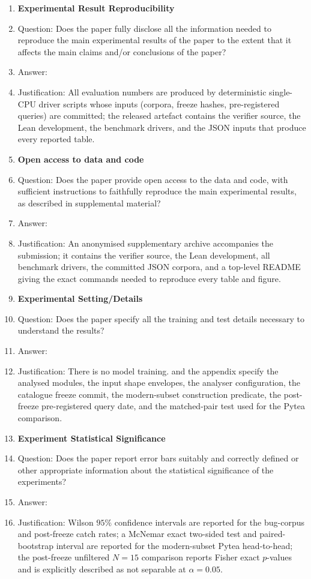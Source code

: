 \begin{enumerate}
\item {\bf Experimental Result Reproducibility}
    \item[] Question: Does the paper fully disclose all the information needed to reproduce the main experimental results of the paper to the extent that it affects the main claims and/or conclusions of the paper?
    \item[] Answer: \answerYes{}
    \item[] Justification: All evaluation numbers are produced by deterministic single-CPU driver scripts whose inputs (corpora, freeze hashes, pre-registered queries) are committed; the released artefact contains the verifier source, the Lean development, the benchmark drivers, and the JSON inputs that produce every reported table.

\item {\bf Open access to data and code}
    \item[] Question: Does the paper provide open access to the data and code, with sufficient instructions to faithfully reproduce the main experimental results, as described in supplemental material?
    \item[] Answer: \answerYes{}
    \item[] Justification: An anonymised supplementary archive accompanies the submission; it contains the verifier source, the Lean development, all benchmark drivers, the committed JSON corpora, and a top-level README giving the exact commands needed to reproduce every table and figure.

\item {\bf Experimental Setting/Details}
    \item[] Question: Does the paper specify all the training and test details necessary to understand the results?
    \item[] Answer: \answerYes{}
    \item[] Justification: There is no model training.  and the appendix specify the analysed modules, the input shape envelopes, the analyser configuration, the catalogue freeze commit, the modern-subset construction predicate, the post-freeze pre-registered query date, and the matched-pair test used for the Pytea comparison.

\item {\bf Experiment Statistical Significance}
    \item[] Question: Does the paper report error bars suitably and correctly defined or other appropriate information about the statistical significance of the experiments?
    \item[] Answer: \answerYes{}
    \item[] Justification: Wilson $95\%$ confidence intervals are reported for the bug-corpus and post-freeze catch rates; a McNemar exact two-sided test and paired-bootstrap interval are reported for the modern-subset Pytea head-to-head; the post-freeze unfiltered $N{=}15$ comparison reports Fisher exact $p$-values and is explicitly described as not separable at $\alpha{=}0.05$.


\end{enumerate}
